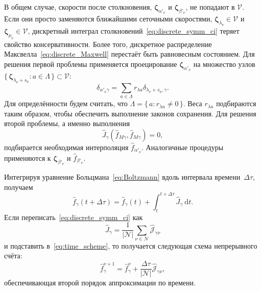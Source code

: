 \documentclass[a4paper,12pt]{article}
\newcommand{\dd}{\:\mathrm{d}}
\newcommand{\bzeta}{\boldsymbol{\zeta}}
\newcommand{\Nu}{\mathcal{N}}
\newcommand{\Set}[2]{\{\,{#1}:{#2}\,\}}
\begin{document}
В общем случае, скорости после столкновения,
\(\bzeta_{\alpha'_\nu}\) и \(\bzeta_{\beta'_\nu}\), не попадают в \(\mathcal{V}\).
Если они просто заменяются ближайшими сеточными скоростями,
\(\bzeta_{\lambda_\nu}\in\mathcal{V}\) и \(\bzeta_{\mu_\nu}\in\mathcal{V}\),
дискретный интеграл столкновений~\eqref{eq:discrete_symm_ci} теряет свойство консервативности.
Более того, дискретное распределение Максвелла~\eqref{eq:discrete_Maxwell} перестаёт быть равновесным состоянием.
Для решения первой проблемы применяется проецирование \(\bzeta_{\alpha'_\nu}\)
на множество узлов \(\Set{\bzeta_{\lambda_\nu+s_a}}{a\in\Lambda}\subset\mathcal{V}\):
\begin{equation}\label{eq:ci_projection}
    \delta_{\alpha'_\nu\gamma} = \sum_{a\in\Lambda} r_{\lambda a}\delta_{\lambda_\nu+s_a,\gamma}.
\end{equation}
Для определённости будем считать, что \(\Lambda = \Set{a}{r_{\lambda a}\neq0}\).
Веса \(r_{\lambda a}\) подбираются таким образом, чтобы обеспечить выполнение законов сохранения.
Для решения второй проблемы, а именно выполнения
\begin{equation}\label{eq:strict_interpolation}
    \hat{J}_\gamma(\hat{f}_{M\gamma}, \hat{f}_{M\gamma}) = 0,
\end{equation}
подбирается необходимая интерполяция \(\hat{f}_{\alpha'_\nu}\).
Аналогичные процедуры применяются к \(\bzeta_{\beta'_\nu}\) и \(\hat{f}_{\beta'_\nu}\).

Интегрируя уравнение Больцмана~\eqref{eq:Boltzmann} вдоль интервала времени~\(\Delta\tau\), получаем
\begin{equation}\label{eq:time_scheme}
    \hat{f}_\gamma(t+\Delta\tau) = \hat{f}_\gamma(t) + \int_t^{t+\Delta\tau} \hat{J}_\gamma \dd{t}.
\end{equation}
Если переписать~\eqref{eq:discrete_symm_ci} как
\begin{equation}\label{eq:discrete_short_ci}
    \hat{J}_\gamma = \frac1{|\Nu|}\sum_{\nu\in\Nu} \hat{\mathscr{J}}_{\gamma\nu}
\end{equation}
и подставить в~\eqref{eq:time_scheme}, то получается следующая схема непрерывного счёта:
\begin{equation}\label{eq:continuous_scheme}
   \hat{f}_\gamma^{\nu+1} = \hat{f}_\gamma^\nu + \frac{\Delta\tau}{|\Nu|}\hat{\mathscr{J}}_{\gamma\nu},
\end{equation}
обеспечивающая второй порядок аппроксимации по времени.
\end{document}
